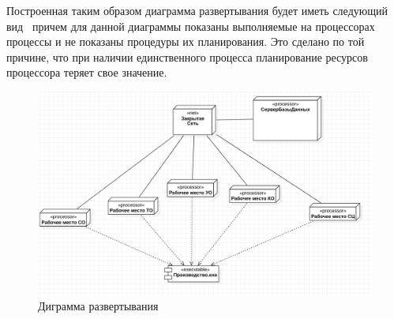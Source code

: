 \documentclass[a4paper,12pt]{report}
\begin{document}
Построенная таким образом диаграмма развертывания будет иметь следующий вид \, причем для данной диаграммы показаны выполняемые на процессорах процессы и не показаны процедуры их планирования. Это сделано по той причине, что при наличии единственного процесса планирование ресурсов процессора теряет свое значение.

\begin{figure}[h!]
	\centering
	\includegraphics[width=0.7\linewidth]{images/deployementfull}
	\caption{Диграмма развертывания}
	\label{fig:deployementfull}
\end{figure}

\newpage
{}
\listoffigures
\newpage
{}
\listoftables
\end{document}
